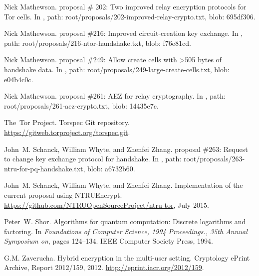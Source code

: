 \documentclass[USenglish,oneside,twocolumn]{article}
\theoremstyle{dgthm}
\theoremstyle{dgdef}
\begin{document}
\begin{thebibliography}{10}
Nick Mathewson.
 proposal \# 202: Two improved relay encryption protocols for
  {Tor} cells.
\newblock In \cite{TorSpec}, path:
  root/proposals/202-improved-relay-crypto.txt, blob: 695df306.

Nick Mathewson.
 proposal \#216: Improved circuit-creation key exchange.
\newblock In \cite{TorSpec}, path: root/proposals/216-ntor-handshake.txt, blob:
  f76e81cd.

Nick Mathewson.
 proposal \#249: Allow create cells with >505 bytes of handshake
  data.
\newblock In \cite{TorSpec}, path: root/proposals/249-large-create-cells.txt,
  blob: e04b4c0c.

Nick Mathewson.
 proposal \#261: {AEZ} for relay cryptography.
\newblock In \cite{TorSpec}, path: root/proposals/261-aez-crypto.txt, blob:
  14435e7c.

The~{Tor} Project.
\newblock Torspec {Git} repository.
\newblock \url{https://gitweb.torproject.org/torspec.git}.

John~M. Schanck, William Whyte, and Zhenfei Zhang.
 proposal \#263: Request to change key exchange protocol for
  handshake.
\newblock In \cite{TorSpec}, path:
  root/proposals/263-ntru-for-pq-handshake.txt, blob: a6732b60.

John~M. Schanck, William Whyte, and Zhenfei Zhang.
\newblock Implementation of the current proposal using {NTRUEncrypt}.
\newblock \url{https://github.com/NTRUOpenSourceProject/ntru-tor}, July 2015.

Peter~W. Shor.
\newblock Algorithms for quantum computation: Discrete logarithms and
  factoring.
\newblock In {\em Foundations of Computer Science, 1994 Proceedings., 35th
  Annual Symposium on}, pages 124--134. IEEE Computer Society Press, 1994.

G.M. Zaverucha.
\newblock Hybrid encryption in the multi-user setting.
\newblock Cryptology ePrint Archive, Report 2012/159, 2012.
\newblock \url{http://eprint.iacr.org/2012/159}.

\end{thebibliography}
\end{document}
